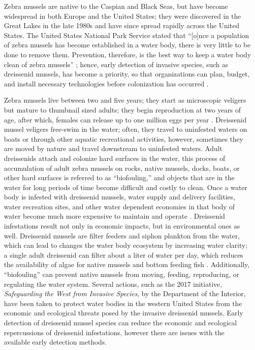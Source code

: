 \documentclass[12pt]{article}\usepackage[]{graphicx}\usepackage[]{color}
\begin{document}
Zebra mussels are native to the Caspian and Black Seas, but have become widespread in both Europe and the United States; they were discovered in the Great Lakes in the late 1980s and have since spread rapidly across the United States. The United States National Park Service stated that ``[o]nce a population of zebra mussels has become established in a water body, there is very little to be done to remove them. Prevention, therefore, is the best way to keep a water body clean of zebra mussels'' \cite{NPS}; hence, early detection of invasive species, such as dreissenid mussels, has become a priority, so that organizations can plan, budget, and install necessary technologies before colonization has occurred \cite{Holser:body}. 

Zebra mussels live between two and five years; they start as microscopic veligers but mature to thumbnail sized adults; they begin reproduction at two years of age, after which, females can release up to one million eggs per year \cite{NPS}. Dreissenid mussel veligers free-swim in the water; often, they travel to uninfested waters on boats or through other aquatic recreational activities, however, sometimes they are moved by nature and travel downstream to uninfested waters. Adult dreissenids attach and colonize hard surfaces in the water, this process of accumulation of adult zebra mussels on rocks, native mussels, docks, boats, or other hard surfaces is referred to as ``biofouling,'' and objects that are in the water for long periods of time become difficult and costly to clean. Once a water body is infested with dreissenid mussels, water supply and delivery facilities, water recreation sites, and other water dependent economies in that body of water become much more expensive to maintain and operate \cite{BOR}. Dreissenid infestations result not only in economic impacts, but in environmental ones as well. Dreissenid mussels are filter feeders and siphon plankton from the water, which can lead to changes the water body ecosystem by increasing water clarity; a single adult dreissenid can filter about a liter of water per day, which reduces the availability of algae for native mussels and bottom feeding fish \cite{BOR}. Additionally, ``biofouling'' can prevent native mussels from moving, feeding, reproducing, or regulating the water system. Several actions, such as the 2017 initiative, \textit{Safeguarding the West from Invasive Species}, by the Department of the Interior, have been taken to protect water bodies in the western United States from the economic and ecological threats posed by the invasive dreissenid mussels. Early detection of dreissenid mussel species can reduce the economic and ecological repercussions of dreissenid infestations, however there are issues with the available early detection methods. 
\end{document}
